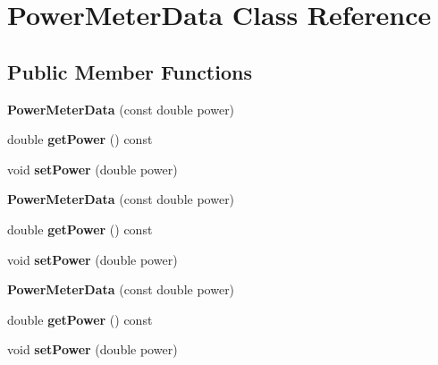 \hypertarget{class_power_meter_data}{}\section{Power\+Meter\+Data Class Reference}
\label{class_power_meter_data}
\subsection*{Public Member Functions}
\begin{DoxyCompactItemize}
\item 
\mbox{\label{class_power_meter_data_a96d49c07bff6b81f9fdbaae47f1ef0b0}} 
{\bfseries Power\+Meter\+Data} (const double power)
\item 
\mbox{\label{class_power_meter_data_a040d5732522c254abb23e43d69de8638}} 
double {\bfseries get\+Power} () const
\item 
\mbox{\label{class_power_meter_data_ad298e169471609ab7714bd6dd3d381de}} 
void {\bfseries set\+Power} (double power)
\item 
\mbox{\label{class_power_meter_data_a96d49c07bff6b81f9fdbaae47f1ef0b0}} 
{\bfseries Power\+Meter\+Data} (const double power)
\item 
\mbox{\label{class_power_meter_data_a040d5732522c254abb23e43d69de8638}} 
double {\bfseries get\+Power} () const
\item 
\mbox{\label{class_power_meter_data_ad298e169471609ab7714bd6dd3d381de}} 
void {\bfseries set\+Power} (double power)
\item 
\mbox{\label{class_power_meter_data_a96d49c07bff6b81f9fdbaae47f1ef0b0}} 
{\bfseries Power\+Meter\+Data} (const double power)
\item 
\mbox{\label{class_power_meter_data_a040d5732522c254abb23e43d69de8638}} 
double {\bfseries get\+Power} () const
\item 
\mbox{\label{class_power_meter_data_ad298e169471609ab7714bd6dd3d381de}} 
void {\bfseries set\+Power} (double power)
\end{DoxyCompactItemize}


